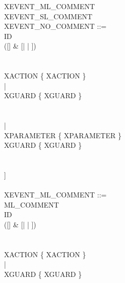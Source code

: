 \begin{center}
\begin{Bcode}
    \Btab \Btab XEVENT\_ML\_COMMENT\\
    \Btab \Btab XEVENT\_SL\_COMMENT\\
    XEVENT\_NO\_COMMENT ::=\\
    \Btab \Btab ID \\
    \Btab \Btab ([\Bextended] \& [\Bordinary | \Bconvergent | \Banticipated])\\
    \Btab \Btab [\Brefines{} ID \{ ID \}]\\
    \Btab \Btab [\\
    \Btab \Btab \Btab [\Bwith{} XWITNESS \{ XWITNESS \}] \\
    \Btab \Btab \Btab \Bbegin{} XACTION \{ XACTION \} \\
    \Btab \Btab \Btab | \\
    \Btab \Btab \Btab \Bwhen{} XGUARD \{ XGUARD \}\\
    \Btab \Btab {} \\
    \Btab \Btab {} \\
    \Btab \Btab \Btab | \\
    \Btab \Btab \Btab \Bany{} XPARAMETER \{ XPARAMETER \}\\
    \Btab \Btab \Btab \Bwhere{} XGUARD \{ XGUARD \}\\
    \Btab \Btab {} \\
    \Btab \Btab {} \\
    \Btab \Btab ]\\
    \Btab \Btab \Bend\\
    XEVENT\_ML\_COMMENT ::=\\
    \Btab \Btab ML\_COMMENT\\
    \Btab \Btab ID \\
    \Btab \Btab ([\Bextended] \& [\Bordinary | \Bconvergent | \Banticipated])\\
    \Btab \Btab [\Brefines{} ID \{ ID \}]\\
    \Btab \Btab [\\
    \Btab \Btab \Btab [\Bwith{} XWITNESS \{ XWITNESS \}] \\
    \Btab \Btab \Btab \Bbegin{} XACTION \{ XACTION \} \\
    \Btab \Btab \Btab | \\
    \Btab \Btab \Btab \Bwhen{} XGUARD \{ XGUARD \}\\
    \Btab \Btab {} \\

\end{Bcode}
\end{center}
